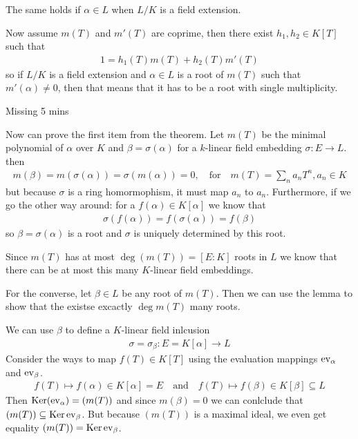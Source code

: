 The same holds if $\alpha \in L$ when $L/K$ is a field extension.

Now assume $m(T)$ and $m'(T)$ are coprime, then there exist $h_1,h_2 \in K[T]$ such that
\begin{align*}
	1 = h_1(T)m(T) + h_2(T)m'(T)
\end{align*}
so if $L/K$ is a field extension and $\alpha \in L$ is a root of $m(T)$ such that $m'(\alpha) \neq 0$, then that means that it has to be a root with single multiplicity.

\begin{center}
	Missing 5 mins
\end{center}

Now can prove the first item from the theorem.
Let $m(T)$ be the minimal polynomial of $\alpha$ over $K$ and $\beta = \sigma(\alpha)$ for a $k$-linear field embedding $\sigma: E \to L$.
then
\begin{align*}
	m(\beta) = m(\sigma(\alpha)) = \sigma(m(\alpha)) = 0, \quad \text{for} \quad m(T) = \sum_{n}a_nT^{n}, a_n \in K
\end{align*}
but because $\sigma$ is a ring homormophism, it  must map $a_n$ to $a_n$. 
Furthermore, if we go the other way around: for a $f(\alpha) \in K[\alpha]$ we know that
\begin{align*}
	\sigma(f(\alpha)) = f(\sigma(\alpha)) = f(\beta)
\end{align*}
so $\beta = \sigma(\alpha)$ is a root and $\sigma$ is uniquely determined by this root.

Since $m(T)$ has at most $\deg(m(T)) = [E:K]$ roots in $L$ we know that there can be at most this many $K$-linear field embeddings.

For the converse, let $\beta \in L$ be any root of $m(T)$. Then we can use the lemma to show that the existse excactly $\deg m(T)$ many roots.

We can use $\beta$ to define a $K$-linear field inlcusion
\begin{align*}
	\sigma = \sigma_{\beta}: E = K[\alpha] \to L
\end{align*}
Consider the ways to map $f(T) \in K[T]$ using the evaluation mappings $\operatorname{ev}_{\alpha}$ and $\operatorname{ev}_{\beta}$. 
\begin{align*}
	f(T) \mapsto f(\alpha) \in K[\alpha] = E \quad \text{and} \quad f(T) \mapsto f(\beta) \in K[\beta] \subseteq L
\end{align*}
Then $\operatorname{Ker}(\operatorname{ev}_{\alpha}) = (m(T))$ and since $m(\beta) = 0$ we can conlclude that $(m(T)) \subseteq \operatorname{Ker} \operatorname{ev}_{\beta}$. But because $(m(T))$ is a maximal ideal, we even get equality $(m(T)) = \operatorname{Ker} \operatorname{ev}_{\beta}$.

